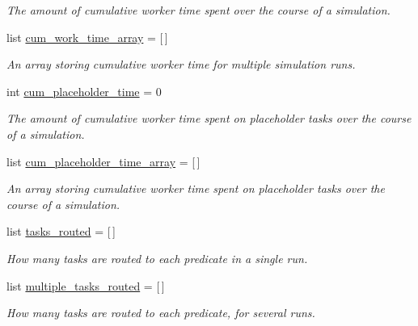 \begin{DoxyCompactItemize}
\begin{DoxyCompactList}\small\item\em The amount of cumulative worker time spent over the course of a simulation. \end{DoxyCompactList}\item 
list \hyperlink{classdynamicfilterapp_1_1test__simulations_1_1_simulation_test_a7649734a340929740a348ac52178ff96}{cum\+\_\+work\+\_\+time\+\_\+array} = \mbox{[}$\,$\mbox{]}
\begin{DoxyCompactList}\small\item\em An array storing cumulative worker time for multiple simulation runs. \end{DoxyCompactList}\item 
int \hyperlink{classdynamicfilterapp_1_1test__simulations_1_1_simulation_test_ad624910d290a0fbde1a5c6162997cf34}{cum\+\_\+placeholder\+\_\+time} = 0
\begin{DoxyCompactList}\small\item\em The amount of cumulative worker time spent on placeholder tasks over the course of a simulation. \end{DoxyCompactList}\item 
list \hyperlink{classdynamicfilterapp_1_1test__simulations_1_1_simulation_test_a501a8c79bce178354e4229610109e71d}{cum\+\_\+placeholder\+\_\+time\+\_\+array} = \mbox{[}$\,$\mbox{]}
\begin{DoxyCompactList}\small\item\em An array storing cumulative worker time spent on placeholder tasks over the course of a simulation. \end{DoxyCompactList}\item 
list \hyperlink{classdynamicfilterapp_1_1test__simulations_1_1_simulation_test_aab2fc3f0d608ab6bc5deb305f3027959}{tasks\+\_\+routed} = \mbox{[}$\,$\mbox{]}
\begin{DoxyCompactList}\small\item\em How many tasks are routed to each predicate in a single run. \end{DoxyCompactList}\item 
list \hyperlink{classdynamicfilterapp_1_1test__simulations_1_1_simulation_test_aa9725b777265410b69964ff9abbf3559}{multiple\+\_\+tasks\+\_\+routed} = \mbox{[}$\,$\mbox{]}
\begin{DoxyCompactList}\small\item\em How many tasks are routed to each predicate, for several runs. \end{DoxyCompactList}\item 

\end{DoxyCompactItemize}
